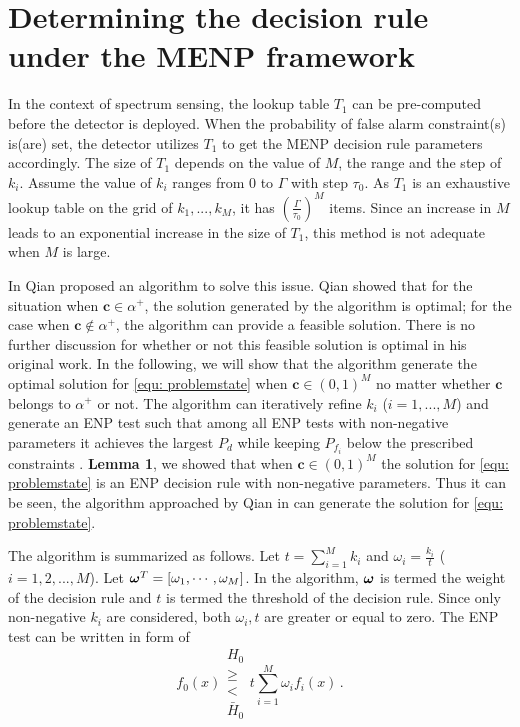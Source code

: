 
\section{Determining the decision rule under the MENP framework}
In the context of spectrum sensing, the lookup table $T_1$ can be pre-computed  before the detector is deployed. When the probability of false alarm constraint(s) is(are) set, the detector utilizes $T_1$ to get the MENP decision  rule parameters accordingly. The size of $T_1$ depends on the value of $M$, the range and the step of $k_i$.  Assume the value of $k_i$ ranges from $0$ to $\Gamma$ with step $\tau_0$. As $T_1$ is an exhaustive lookup table on the grid of $k_1, ..., k_M$, it has $(\frac{\Gamma}{\tau_0})^M$ items. Since an increase in $M$ leads to an exponential increase in the size of $T_1$, this method is not adequate when $M$ is large. 

In \cite{zhang1999design, zhang2000efficient} Qian proposed an algorithm to solve this issue. 
 Qian showed that for the situation when $\mathbf{c} \in \alpha^+$, the solution generated by the algorithm is optimal; 
 for the case when $\mathbf{c} \notin \alpha^+$, the algorithm can provide a feasible solution. There is no further discussion for whether or not this feasible solution is optimal in his original work.  
In the following, we will show that the algorithm generate the optimal solution for \eqref{equ: problemstate} when $\mathbf{c} \in (0, 1)^M$ no matter whether $\mathbf{c}$ belongs to $\alpha^+$ or not. 
The algorithm can iteratively refine $k_i$ ($i=1, ..., M$) and generate an ENP test  such that among all ENP tests with non-negative parameters it achieves the largest $P_d$ while keeping $P_{f_i}$ below the prescribed constraints \cite{zhang1999design, zhang2000efficient}. \textbf{Lemma 1}, we showed that when $\mathbf{c} \in (0, 1)^M$ the solution for \eqref{equ: problemstate} is an ENP decision rule with non-negative parameters. Thus it can be seen, the  algorithm approached by Qian in \cite{zhang1999design, zhang2000efficient} can generate the solution for \eqref{equ: problemstate}.

The algorithm is summarized as follows. Let $t = \sum_{i=1}^{M}k_i$ and $\omega_i = \frac{k_i}{t}$ ($i=1, 2, ..., M$).
Let $\boldsymbol{\omega}^T = [\omega_1, \cdots, \omega_M]$. 
In the algorithm, $\boldsymbol{\omega}$ is termed the weight of the decision rule and $t$ is termed the threshold of the decision rule. Since only non-negative $k_i$ are considered, both $\omega_i, t$ are greater or equal to zero. The ENP test can be written in form of 
\begin{equation}
\label{qian dec}
f_0(x) \substack{H_0 \\ \geq \\ < \\ \bar{H}_0} t\sum_{i=1}^{M}\omega_if_i(x)\,.
\end{equation}

